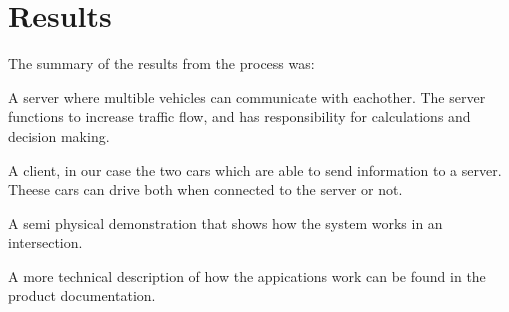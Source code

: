\section{Results}

The summary of the results from the process was:

A server where multible vehicles can communicate with eachother. The server functions to increase traffic flow, and has responsibility for calculations and decision making. 

A client, in our case the two cars which are able to send information to a server. Theese cars can drive both when connected to the server or not.

A semi physical demonstration that shows how the system works in an intersection.

A more technical description of how the appications work can be found in the product documentation. 




